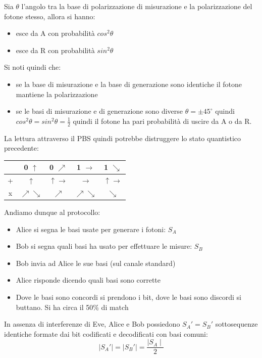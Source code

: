 Sia $\theta$ l'angolo tra la base di polarizzazione di misurazione e la polarizzazione del fotone stesso, allora si hanno:
\begin{itemize}
    \item esce da A con probabilità $cos^2 \theta$
    \item esce da R con probabilità $sin^2 \theta$
\end{itemize}

Si noti quindi che:
\begin{itemize}
    \item se la base di misurazione e la base di generazione sono identiche il fotone mantiene la polarizzazione
    \item se le basi di misurazione e di generazione sono diverse $\theta = \pm45^{\circ}$ quindi $cos^2\theta = sin^2\theta = \frac{1}{2}$ quindi il fotone ha pari probabilità di uscire da A o da R.
\end{itemize}

La lettura attraverso il PBS quindi potrebbe distruggere lo stato quantistico precedente:
\begin{table}[ht!]
    \centering
    \begin{tabular}{c|c|c|c|c}
        & 0 $\uparrow$ & 0 $\nearrow$ & 1 $\rightarrow$ & 1 $\searrow$ \\
        \hline
        + & $\uparrow$ & $\uparrow \rightarrow$ & $\rightarrow$ & $\uparrow \rightarrow$  \\
        x & $\nearrow \searrow$ & $\nearrow$ & $\nearrow \searrow$ & $\searrow$
    \end{tabular}
\end{table}

Andiamo dunque al protocollo:
\begin{itemize}
    \item Alice si segna le basi usate per generare i fotoni: $S_A$
    \item Bob si segna quali basi ha usato per effettuare le misure: $S_B$
    \item Bob invia ad Alice le sue basi (sul canale standard)
    \item Alice risponde dicendo quali basi sono corrette
    \item Dove le basi sono concordi si prendono i bit, dove le basi sono discordi si buttano.
    Si ha circa il 50\% di match
\end{itemize}

In assenza di interferenze di Eve, Alice e Bob possiedono $S_A' = S_B'$ sottosequenze identiche formate dai bit codificati e decodificati con basi comuni:
$$ \mid S_A' \mid = \mid S_B' \mid = \frac{\mid S_A \mid}{2} $$

